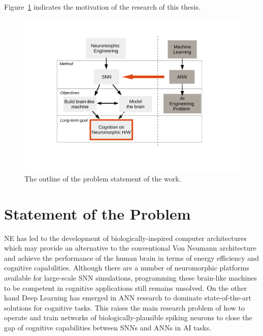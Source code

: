 Figure~\ref{fig:intro} indicates the motivation of the research of this thesis.

\begin{figure}[tbh!]
	\centering
	\includegraphics[width=1.0\textwidth]{pics_intro/intro2.pdf}
	\caption{
		The outline of the problem statement of the work.
	}
	\label{fig:intro}
\end{figure}




\section{Statement of the Problem}
\label{sec:state_problem}
NE has led to the development of biologically-inspired computer architectures which may provide an alternative to the conventional Von Neumann architecture and achieve the performance of the human brain in terms of energy efficiency and cognitive capabilities.
Although there are a number of neuromorphic platforms available for large-scale SNN simulations, programming these brain-like machines to be competent in cognitive applications still remains unsolved.
On the other hand Deep Learning has emerged in ANN research to dominate state-of-the-art solutions for cognitive tasks.
This raises the main research problem of how to operate and train networks of biologically-plausible spiking neurons to close the gap of cognitive capabilities between SNNs and ANNs in AI tasks.


